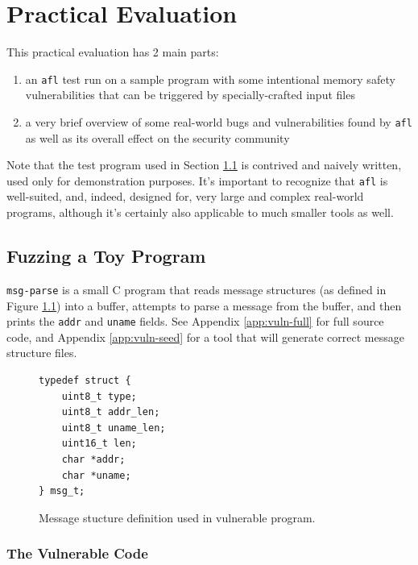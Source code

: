 \chapter{Practical Evaluation}
\label{sec:4}

This practical evaluation has 2 main parts:
\begin{enumerate}
    \item an \texttt{afl} test run on a sample program with some intentional
    memory safety vulnerabilities that can be triggered by specially-crafted
    input files
    \item a very brief overview of some real-world bugs and vulnerabilities
    found by \texttt{afl} as well as its overall effect on the security
    community
\end{enumerate}

Note that the test program used in Section \ref{sec:my-fuzz} is contrived and
naively written, used only for demonstration purposes. It's important to
recognize that \texttt{afl} is well-suited, and, indeed, designed for, very
large and complex real-world programs, although it's certainly also applicable
to much smaller tools as well.

\section{Fuzzing a Toy Program}
\label{sec:my-fuzz}

\texttt{msg-parse} is a small C program that reads
message structures (as defined in Figure \ref{fig:msg}) into a buffer,
attempts to parse a message from the buffer, and then prints the
\texttt{addr} and \texttt{uname} fields. See Appendix \ref{app:vuln-full}
for full source code, and Appendix \ref{app:vuln-seed} for a tool that
will generate correct message structure files. \\

\begin{figure}[H]
    \begin{lstlisting}[language={[ANSI]C}]
typedef struct {
    uint8_t type;
    uint8_t addr_len;
    uint8_t uname_len;
    uint16_t len;
    char *addr;
    char *uname;
} msg_t;
\end{lstlisting}
\caption{Message stucture definition used in vulnerable program.}
\label{fig:msg}
\end{figure}

\subsection{The Vulnerable Code}


